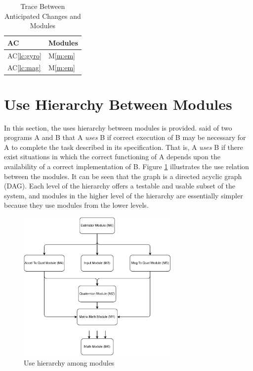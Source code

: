 \documentclass[12pt, titlepage]{article}
\newcommand{\acref}[1]{AC\ref{#1}}
\newcommand{\mref}[1]{M\ref{#1}}
\begin{document}
\begin{table}[H]
\centering
\begin{tabular}{p{} p{}}
\toprule
\textbf{AC} & \textbf{Modules}\\
\midrule
\acref{lc:gyro} & \mref{m:em}\\
\acref{lc:mag} & \mref{m:em}\\
\bottomrule
\end{tabular}
\caption{Trace Between Anticipated Changes and Modules}
\label{TblACT}
\end{table}

\section{Use Hierarchy Between Modules} \label{SecUse}

In this section, the uses hierarchy between modules is provided. \citet{Parnas1978} said of two
programs A and B that A {\em uses} B if correct execution of B may be necessary for A to complete
the task described in its specification. That is, A {\em uses} B if there exist situations in which
the correct functioning of A depends upon the availability of a correct implementation of B.  Figure
\ref{FigUH} illustrates the use relation between the modules. It can be seen that the graph is a
directed acyclic graph (DAG). Each level of the hierarchy offers a testable and usable subset of the
system, and modules in the higher level of the hierarchy are essentially simpler because they use
modules from the lower levels.

\begin{figure}[H]
\centering
\includegraphics[width=0.7\textwidth]{uses_diagram.pdf}
\caption{Use hierarchy among modules}
\label{FigUH}
\end{figure}
\end{document}
